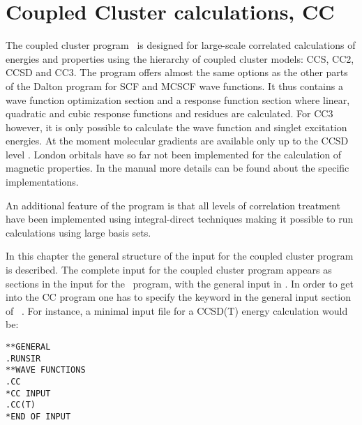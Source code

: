 \chapter{Coupled Cluster calculations, CC}\label{ch:CC}

The coupled cluster program \cc\ is designed for large-scale
correlated calculations of energies and properties using the
hierarchy of coupled cluster models: CCS, CC2, CCSD and CC3.
The program offers almost the same options as the other
parts of the Dalton program for SCF and MCSCF wave functions.
It thus contains a wave function optimization section and 
a response function section where linear, quadratic and cubic response functions 
and residues are calculated.
For CC3 however, it is only possible to calculate the wave function and 
singlet excitation energies. 
At the moment molecular gradients are available 
only up to the CCSD level .  
London orbitals have so far not been implemented 
for the calculation of magnetic properties.
In the manual more details can be found about the specific implementations.

An additional feature of the program is that all levels of correlation
treatment have been implemented using integral-direct techniques making
it possible to run calculations using large basis sets.  

In this chapter the general structure of the input for the
coupled cluster program is described.
The complete input for the coupled cluster program appears as
sections in the input for the \sir\ program, with the general
input in . In order to get into the CC program
one has to specify the  keyword in the general input
section of \sir\ . For instance, a minimal
input file for a CCSD(T) energy calculation would be:
\begin{verbatim}
**GENERAL
.RUNSIR
**WAVE FUNCTIONS
.CC
*CC INPUT
.CC(T)
*END OF INPUT
\end{verbatim}

